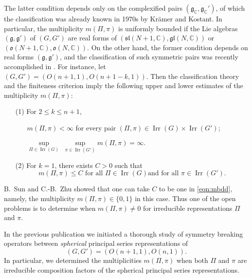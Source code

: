 \medskip
The latter condition depends only
 on the complexified pairs
 $({\mathfrak {g}}_{\mathbb{C}}, {\mathfrak {g}}_{\mathbb{C}}')$, 
 of which the classification
 was already known in 1970s
 by Kr{\"a}mer 
 \cite{Kr1} and Kostant.  
In particular,
 the multiplicity $m(\Pi,\pi)$ is uniformly bounded
 if the Lie algebras $({\mathfrak {g}}, {\mathfrak {g}}')$ of $(G,G')$ 
 are real forms
 of $({\mathfrak {sl}}(N+1,{\mathbb{C}}),
 {\mathfrak {gl}}(N,{\mathbb{C}}))$
 or $({\mathfrak {o}}(N+1,{\mathbb{C}}),
 {\mathfrak {o}}(N,{\mathbb{C}}))$.  
On the other hand, 
 the former condition depends on real forms
 $({\mathfrak {g}}, {\mathfrak {g}}')$, 
 and the classification
 of such symmetric pairs was recently accomplished
 in \cite{xKMt}.  
For instance,
 let $(G,G')=(O(n+1,1), O(n+1-k,1))$.  
Then the classification theory \cite{xKMt}
 and the finiteness criterion \cite{xKOfm}
 imply the following upper and lower estimates
 of the multiplicity
$
  m(\Pi,\pi)
$:
\begin{enumerate}
\item[(1)]
For $2 \le k \le n+1$, 
\begin{enumerate}
\item[]
$m(\Pi,\pi)<\infty$
 for every pair $(\Pi,\pi) \in {\operatorname{Irr}}(G)
 \times {\operatorname{Irr}}(G')$;
\item[]
$\underset{\Pi \in {\operatorname{Irr}}(G)}\sup
\,\,
 \underset{\pi \in {\operatorname{Irr}}(G')}\sup
 m(\Pi,\pi)=\infty.
$
\end{enumerate}
\item[(2)]
For $k=1$, 
there exists $C>0$ such that 
\begin{equation}
\label{eqn:mbdd}
m(\Pi,\pi) \le C
\text{ for all $\Pi \in {\operatorname{Irr}}(G)$
 and for all $\pi \in {\operatorname{Irr}}(G')$.}
\end{equation}
\end{enumerate}

B.~Sun  and C.-B.~Zhu \cite{SunZhu} showed
 that one can take $C$ to be one in \eqref{eqn:mbdd}, 
 namely,
 the  multiplicity
$
    m(\Pi,\pi) \in \{0,1\} 
$
 in this case.  
Thus one of the open problems is to determine
 when $m(\Pi, \pi) \ne 0$
 for irreducible representations $\Pi$ and $\pi$.  



In the previous publication \cite{sbon} we initiated a thorough study of symmetry breaking operators
 between {\it{spherical}} principal series representations
of
\begin{equation}
\label{eqn:GG}
     (G,G')=(O(n+1,1),O(n,1)).  
\end{equation}
In particular,
 we determined the multiplicities $m(\Pi, \pi)$
 when both $\Pi$ and $\pi$ are irreducible composition factors
 of the spherical principal series representations. 




